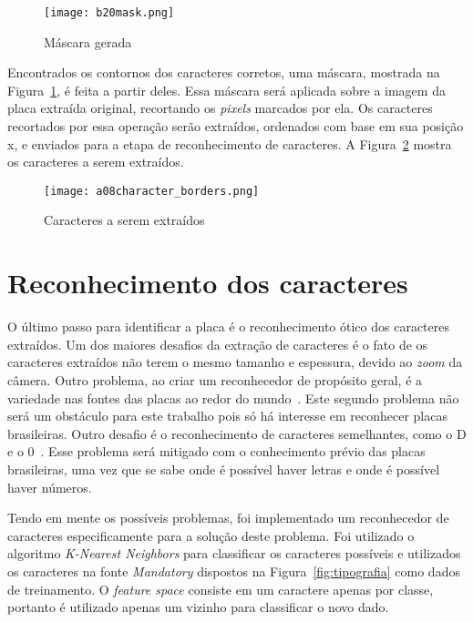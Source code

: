 \begin{figure}[H]
	\centering
	\texttt{[image: b20mask.png]}
	\caption{Máscara gerada}
	\label{fig:mascara}
\end{figure}

Encontrados os contornos dos caracteres corretos, uma máscara, mostrada na
Figura~\ref{fig:mascara}, é feita a partir deles. Essa máscara será aplicada
sobre a imagem da placa extraída original, recortando os \emph{pixels} marcados
por ela. Os caracteres recortados por essa operação serão extraídos, ordenados
com base em sua posição x, e enviados para a etapa de reconhecimento de
caracteres. A Figura~\ref{fig:caracteres_extraidos} mostra os caracteres a serem
extraídos.

\begin{figure}[H]
	\centering
	\texttt{[image: a08character\_borders.png]}
	\caption{Caracteres a serem extraídos}
	\label{fig:caracteres_extraidos}
\end{figure}

\section{Reconhecimento dos caracteres} \label{sec:reconhecimento}

O último passo para identificar a placa é o reconhecimento ótico dos caracteres
extraídos. Um dos maiores desafios da extração de caracteres é o fato de os
caracteres extraídos não terem o mesmo tamanho e espessura, devido ao
\emph{zoom} da câmera. Outro problema, ao criar um reconhecedor de propósito
geral, é a variedade nas fontes das placas ao redor do
mundo~\cite{s2013automatic}. Este segundo problema não será um obstáculo para
este trabalho pois só há interesse em reconhecer placas brasileiras. Outro
desafio é o reconhecimento de caracteres semelhantes, como o D e o
0~\cite{ho2016intelligent}. Esse problema será mitigado com o conhecimento
prévio das placas brasileiras, uma vez que se sabe onde é possível haver letras
e onde é possível haver números.

Tendo em mente os possíveis problemas, foi implementado um reconhecedor de
caracteres especificamente para a solução deste problema. Foi utilizado o
algoritmo \emph{K-Nearest Neighbors} para classificar os caracteres possíveis e
utilizados os caracteres na fonte \emph{Mandatory} dispostos na
Figura~\ref{fig:tipografia} como dados de treinamento. O \emph{feature space}
consiste em um caractere apenas por classe, portanto é utilizado apenas um
vizinho para classificar o novo dado.

